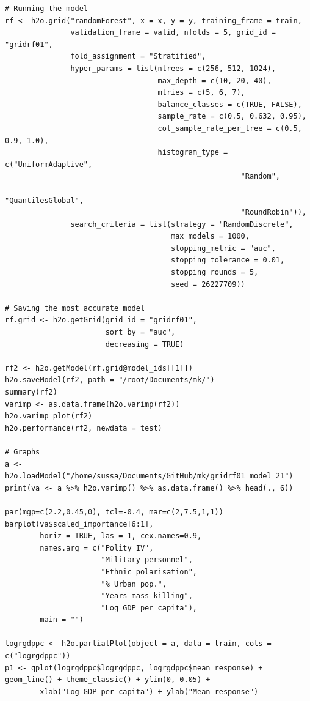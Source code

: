 \begin{verbatim}
# Running the model
rf <- h2o.grid("randomForest", x = x, y = y, training_frame = train, 
               validation_frame = valid, nfolds = 5, grid_id = "gridrf01",
               fold_assignment = "Stratified",
               hyper_params = list(ntrees = c(256, 512, 1024),
                                   max_depth = c(10, 20, 40),
                                   mtries = c(5, 6, 7),
                                   balance_classes = c(TRUE, FALSE),
                                   sample_rate = c(0.5, 0.632, 0.95),
                                   col_sample_rate_per_tree = c(0.5, 0.9, 1.0),
                                   histogram_type = c("UniformAdaptive",
                                                      "Random",
                                                      "QuantilesGlobal",
                                                      "RoundRobin")),
               search_criteria = list(strategy = "RandomDiscrete", 
                                      max_models = 1000, 
                                      stopping_metric = "auc", 
                                      stopping_tolerance = 0.01, 
                                      stopping_rounds = 5, 
                                      seed = 26227709)) 

# Saving the most accurate model
rf.grid <- h2o.getGrid(grid_id = "gridrf01",
                       sort_by = "auc",
                       decreasing = TRUE)

rf2 <- h2o.getModel(rf.grid@model_ids[[1]])
h2o.saveModel(rf2, path = "/root/Documents/mk/")
summary(rf2)
varimp <- as.data.frame(h2o.varimp(rf2))
h2o.varimp_plot(rf2)
h2o.performance(rf2, newdata = test)

# Graphs
a <- h2o.loadModel("/home/sussa/Documents/GitHub/mk/gridrf01_model_21")
print(va <- a %>% h2o.varimp() %>% as.data.frame() %>% head(., 6)) 

par(mgp=c(2.2,0.45,0), tcl=-0.4, mar=c(2,7.5,1,1))
barplot(va$scaled_importance[6:1],
        horiz = TRUE, las = 1, cex.names=0.9,
        names.arg = c("Polity IV", 
                      "Military personnel",
                      "Ethnic polarisation", 
                      "% Urban pop.",
                      "Years mass killing",
                      "Log GDP per capita"),
        main = "")

logrgdppc <- h2o.partialPlot(object = a, data = train, cols = c("logrgdppc"))
p1 <- qplot(logrgdppc$logrgdppc, logrgdppc$mean_response) + geom_line() + theme_classic() + ylim(0, 0.05) +
        xlab("Log GDP per capita") + ylab("Mean response")


\end{verbatim}
